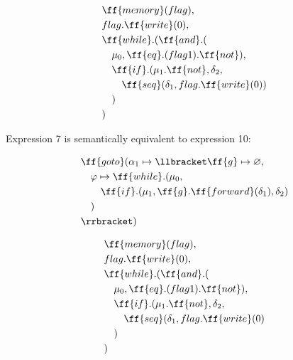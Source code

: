 \documentclass[sigplan,review,11pt,nonacm,natbib=false]{acmart}
\begin{document}
\begin{equation}
\begin{split}
& \ff{memory}(flag), \\
& flag.\ff{write}(0), \\
& \ff{while}.(\ff{and}.( \\
& \quad \mu_0, \ff{eq}.(flag  1).\ff{not}), \\
& \quad \ff{if}.(\mu_1.\ff{not}, \delta_2, \\
& \quad \quad \ff{seq}( \delta_1, flag.\ff{write}(0) )\\
& \quad ) \\
& ) \\
\end{split}
\end{equation}

\begin{theorem}
Expression 7 is semantically equivalent to expression 10:
\end{theorem}

\begin{equation} \nonumber
\begin{split}
& \ff{goto} ( \alpha_1 \mapsto \llbracket \ff{g} \mapsto \varnothing, \\
& \quad \varphi \mapsto \ff{while}.(\mu_0, \\
& \quad \quad \ff{if}.(\mu_1, \ff{g}.\ff{forward}(\delta_1), \delta_2) \\
& \quad ) \\
& \rrbracket) \\
\end{split}
\end{equation}

\hline

\begin{equation} \nonumber
\begin{split}
& \ff{memory}(flag), \\
& flag.\ff{write}(0), \\
& \ff{while}.(\ff{and}.( \\
& \quad \mu_0, \ff{eq}.(flag  1).\ff{not}), \\
& \quad \ff{if}.(\mu_1.\ff{not}, \delta_2, \\
& \quad \quad \ff{seq}( \delta_1, flag.\ff{write}(0) \\
& \quad )\\
& ) \\
\end{split}
\end{equation}
\end{document}
